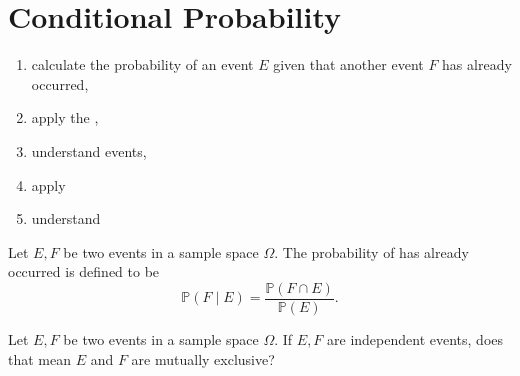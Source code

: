 \documentclass[../main.tex]{subfiles}
\begin{document}
 \section{Conditional Probability}

\begin{objective}
  \begin{enumerate}
    \item calculate the probability of an event \(E\) given that another event \(F\) has already occurred,
    \item apply the ,
    \item understand  events,
    \item apply 
    \item understand  
  \end{enumerate}
\end{objective}

Let \(E,F\) be two events in a sample space \(\Omega\). The probability of  has already occurred is defined to be
\[
  \mathbb{P}(F \mid E) = \frac{\mathbb{P}(F \cap E)}{\mathbb{P}(E)}.
\]

\begin{example}
  Let \(E,F\) be two events in a sample space \(\Omega\). If \(E,F\) are independent events, does that mean \(E\) and \(F\) are mutually exclusive?
\end{example}
\end{document}
